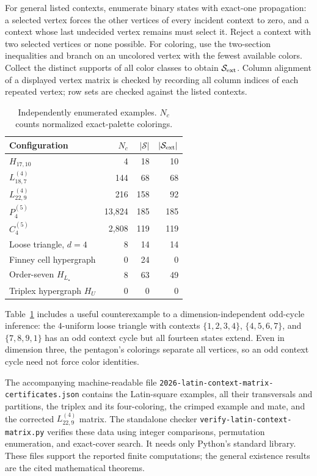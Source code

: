 \documentclass[aps,pra,reprint,superscriptaddress,longbibliography,nofootinbib,floatfix,10pt]{revtex4-2}
\theoremstyle{definition}\newtheorem{definition}[theorem]{Definition}
\theoremstyle{remark}\newtheorem{remark}[theorem]{Remark}
\newcommand{\Sc}{\mathcal S}\newcommand{\Cc}{\mathcal C}
\begin{document}
For general listed contexts, enumerate binary states with exact-one propagation: a selected vertex forces the other vertices of every incident context to zero, and a context whose last undecided vertex remains must select it. Reject a context with two selected vertices or none possible. For coloring, use the two-section inequalities and branch on an uncolored vertex with the fewest available colors. Collect the distinct supports of all color classes to obtain $\Sc_{\rm ext}$. Column alignment of a displayed vertex matrix is checked by recording all column indices of each repeated vertex; row sets are checked against the listed contexts.

\begin{table}[t]
\centering\small
\caption{Independently enumerated examples. $N_c$ counts normalized exact-palette colorings.}\label{tab:verification-counts}
\begin{tabular}{lrrr}\toprule
Configuration & $N_c$ & $|\Sc|$ & $|\Sc_{\rm ext}|$\\\midrule
$H_{17,10}$ & 4 &18&10\\
$L_{18,7}^{(4)}$ &144&68&68\\
$L_{22,9}^{(4)}$ &216&158&92\\
$P_4^{(5)}$ &13,824&185&185\\
$C_4^{(5)}$ &2,808&119&119\\
Loose triangle, $d=4$ &8&14&14\\
Finney cell hypergraph &0&24&0\\
Order-seven $H_{L_\star}$ &8&63&49\\
Triplex hypergraph $H_U$ &0&0&0\\\bottomrule
\end{tabular}
\end{table}

Table~\ref{tab:verification-counts} includes a useful counterexample to a dimension-independent odd-cycle inference: the $4$-uniform loose triangle with contexts $\{1,2,3,4\}$, $\{4,5,6,7\}$, and $\{7,8,9,1\}$ has an odd context cycle but all fourteen states extend. Even in dimension three, the pentagon's colorings separate all vertices, so an odd context cycle need not force color identities.

The accompanying machine-readable file \texttt{2026-latin-context-matrix-certificates.json} contains the Latin-square examples, all their transversals and partitions, the triplex and its four-coloring, the crimped example and mate, and the corrected $L_{22,9}^{(4)}$ matrix. The standalone checker \texttt{verify-latin-context-matrix.py} verifies these data using integer comparisons, permutation enumeration, and exact-cover search. It needs only Python's standard library. These files support the reported finite computations; the general existence results are the cited mathematical theorems.




\end{document}
